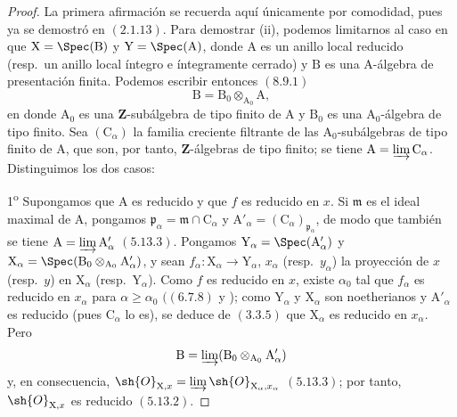 \begin{proof}
La primera afirmación se recuerda aquí únicamente por comodidad, pues ya se demostró en $(2.1.13)$. Para demostrar (ii), podemos limitarnos al caso en que $\mathrm{X}=\Spec(\mathrm{B})$ y $\mathrm{Y}=\Spec(\mathrm{A})$, donde $\mathrm{A}$ es un anillo local reducido (resp.\ un anillo local íntegro e íntegramente cerrado) y $\mathrm{B}$ es una $\mathrm{A}$-álgebra de presentación finita. Podemos escribir entonces $(8.9.1)$
\[
  \mathrm{B}=\mathrm{B}_0\otimes_{\mathrm{A}_0}\mathrm{A},
\]
en donde $\mathrm{A}_0$ es una $\mathbf{Z}$-subálgebra de tipo finito de $\mathrm{A}$ y $\mathrm{B}_0$ es una $\mathrm{A}_0$-álgebra de tipo finito. Sea $(\mathrm{C}_\alpha)$ la familia creciente filtrante de las $\mathrm{A}_0$-subálgebras de tipo finito de $\mathrm{A}$, que son, por tanto, $\mathbf{Z}$-álgebras de tipo finito; se tiene $\mathrm{A}=\varinjlim\mathrm{C}_\alpha$. Distinguimos los dos casos:

1\textsuperscript{o} Supongamos que $\mathrm{A}$ es reducido y que $f$ es reducido en $x$. Si $\mathfrak{m}$ es el ideal maximal de $\mathrm{A}$, pongamos $\mathfrak{p}_\alpha=\mathfrak{m}\cap\mathrm{C}_\alpha$ y $\mathrm{A}'_\alpha=(\mathrm{C}_\alpha)_{\mathfrak{p}_\alpha}$, de modo que también se tiene $\mathrm{A}=\varinjlim\mathrm{A}'_\alpha$ $(5.13.3)$. Pongamos $\mathrm{Y}_\alpha=\Spec(\mathrm{A}'_\alpha)$ y $\mathrm{X}_\alpha=\Spec(\mathrm{B}_0\otimes_{\mathrm{A}_0}\mathrm{A}'_\alpha)$, y sean $f_\alpha:\mathrm{X}_\alpha\to\mathrm{Y}_\alpha$, $x_\alpha$ (resp.\ $y_\alpha$) la proyección de $x$ (resp.\ $y$) en $\mathrm{X}_\alpha$ (resp.\ $\mathrm{Y}_\alpha$). Como $f$ es reducido en $x$, existe $\alpha_0$ tal que $f_\alpha$ es reducido en $x_\alpha$ para $\alpha\geqslant\alpha_0$ $((6.7.8)$ y ); como $\mathrm{Y}_\alpha$ y $\mathrm{X}_\alpha$ son noetherianos y $\mathrm{A}'_\alpha$ es reducido (pues $\mathrm{C}_\alpha$ lo es), se deduce de $(3.3.5)$ que $\mathrm{X}_\alpha$ es reducido en $x_\alpha$. Pero
\[
  \mathrm{B}=\varinjlim(\mathrm{B}_0\otimes_{\mathrm{A}_0}\mathrm{A}'_\alpha)
\]
y, en consecuencia, $\sh{O}_{\mathrm{X},x}=\varinjlim\sh{O}_{\mathrm{X}_\alpha,x_\alpha}$ $(5.13.3)$; por tanto, $\sh{O}_{\mathrm{X},x}$ es reducido $(5.13.2)$.


\end{proof}

